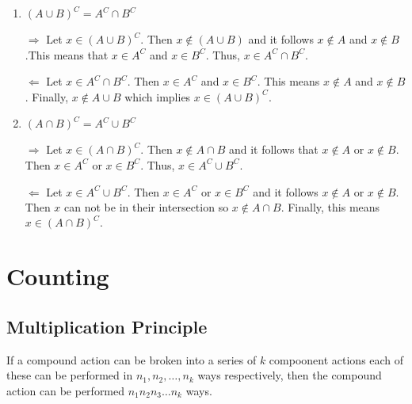 \documentclass[10pt]{report}
\begin{document}
    
\begin{enumerate}
    
  \item  $(A \cup B)^C = A^C \cap B^C$
    \begin{myproof}
        
    \par
    $\Rightarrow$ Let $x \in (A \cup B)^C$. Then $x \not\in (A \cup B)$ and it follows $x \not\in A$ and $x\not\in B$.This means that $x \in A^C$ and $x \in B^C$. Thus, $x \in A^C \cap B^C.$
    \par
    $\Leftarrow$ Let $x\in A^C \cap B^C$. Then $x \in A^C$ and $x \in B^C.$ This means $x \not\in A $ and $x \not\in B$. Finally, $x\not\in A \cup B$ which implies $x \in (A \cup B)^C.$

    \end{myproof}

  \item $(A \cap B)^C = A^C \cup B^C$

    \begin{myproof}
      $\Rightarrow$ Let $x \in (A \cap B)^C$. Then $x \not\in A \cap B$ and it follows that $x \not\in A$ or $x \not\in B.$Then $x \in A^C$ or $x \in B^C.$ Thus, $x \in A^C \cup B^C$.
      \par
      $\Leftarrow$ Let $x \in A^C \cup B^C.$ Then $x \in A^C$ or $x \in B^C$ and it follows $x \not\in A$ or $x\not\in B.$ Then $x$ can not be in their intersection so $x \not\in A \cap B.$ Finally, this means $x \in (A \cap B)^C.$
        
    \end{myproof}

\end{enumerate}


\section{Counting}

\subsection{Multiplication Principle}

If a compound action can be broken into a series of $k$ compoonent actions each of these can be performed in $n_1, n_2, \dots, n_k $  ways respectively, then the compound action can be performed $n_1n_2n_3 \dots n_k$ ways.

\smallskip

\end{document}

